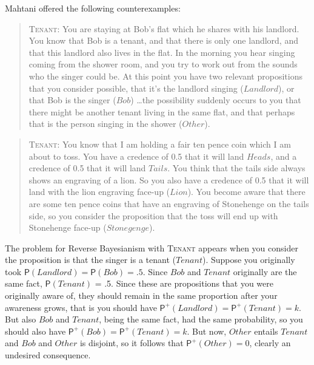 \documentclass[
  11pt,
  dvipsnames,enabledeprecatedfontcommands]{scrartcl}
\newcommand{\ppr}[2]{\ensuremath{\mathsf{P}^{#1}(#2)}}
\begin{document}
\label{sec:mathani}

Mahtani offered the following counterexamples:

\begin{quote}
\textsc{Tenant}: You are staying at Bob's flat which he shares with his landlord. You know
that Bob is a tenant, and that there is only one landlord, and that this landlord also
lives in the flat. In the morning you hear singing coming from the shower room, and
you try to work out from the sounds who the singer could be. At this point you have
two relevant propositions that you consider possible, that it's the landlord singing ($Landlord$), or that Bob is the singer ($Bob$) \dots  the possibility suddenly occurs to you that there might be
another tenant living in the same flat, and that perhaps that is the person singing in the
shower ($Other$).
\end{quote}

\begin{quote} 
\textsc{Tenant}: You know that I am holding a fair ten pence coin which I am about to toss. You
have a credence of 0.5 that it will land $Heads$, and a credence of 0.5 that it will
land $Tails$. You think that the tails side always shows an engraving of a lion. So you
also  have a credence of 0.5 that it will land with the lion engraving face-up ($Lion$). You  become aware
that  there are some ten pence coins that have an engraving of Stonehenge on the tails side, so you consider the proposition that the toss will end up with Stonehenge face-up ($Stonegenge$).



\end{quote}

\noindent The problem for Reverse Bayesianism with \textsc{Tenant}
appears when you consider the proposition is that the singer is a tenant
(\(Tenant\)). Suppose you originally took
\(\mathsf{P}(Landlord) = \mathsf{P}(Bob) = .5\). Since \(Bob\) and
\(Tenant\) originally are the same fact, \(\mathsf{P}(Tenant)\) = .5.
Since these are propositions that you were originally aware of, they
should remain in the same proportion after your awareness grows, that is
you should have \(\ppr{+}{Landlord} = \ppr{+}{Tenant} = k\). But also
\(Bob\) and \(Tenant\), being the same fact, had the same probability,
so you should also have \(\ppr{+}{Bob} = \ppr{+}{Tenant} = k\). But now,
\(Other\) entails \(Tenant\) and \(Bob\) and \(Other\) is disjoint, so
it follows that \(\ppr{+}{Other} = 0\), clearly an undesired
consequence.
\end{document}
